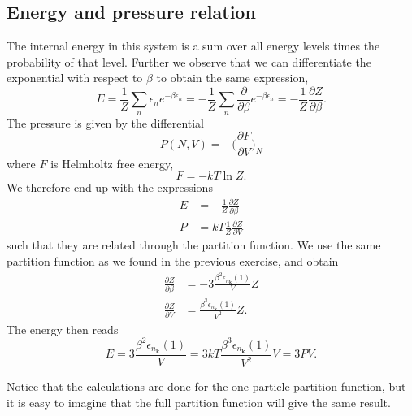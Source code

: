 \documentclass[norsk,a4paper,12pt]{article}
\begin{document}
\subsection{Energy and pressure relation}
The internal energy in this system is a sum over all energy levels times the probability of that level. Further we observe that we can differentiate the exponential with respect to $\beta$ to obtain the same expression,
\begin{equation}
E=\frac{1}{Z}\sum_n\epsilon_ne^{-\beta\epsilon_n}=-\frac{1}{Z}\sum_n\frac{\partial}{\partial\beta}e^{-\beta\epsilon_n}=-\frac{1}{Z}\frac{\partial Z}{\partial\beta}.
\end{equation}
The pressure is given by the differential
\begin{equation}
P(N,V)=-\Big(\frac{\partial F}{\partial V}\Big)_N
\end{equation}
where $F$ is Helmholtz free energy,
\begin{equation}
F=-kT\ln Z.
\end{equation}
We therefore end up with the expressions 
\begin{align}
E&=-\frac{1}{Z}\frac{\partial Z}{\partial\beta}\\
P&=kT\frac{1}{Z}\frac{\partial Z}{\partial V}
\end{align}
such that they are related through the partition function. We use the same partition function as we found in the previous exercise, and obtain
\begin{align}
\frac{\partial Z}{\partial \beta}&=-3\frac{\beta^2\epsilon_{n_{\boldsymbol{k}}}(1)}{V}Z\\
\frac{\partial Z}{\partial V}&=\frac{\beta^3\epsilon_{n_{\boldsymbol{k}}}(1)}{V^2}Z.
\end{align}
The energy then reads
\begin{equation}
E=3\frac{\beta^2\epsilon_{n_{\boldsymbol{k}}}(1)}{V}=3kT\frac{\beta^3\epsilon_{n_{\boldsymbol{k}}}(1)}{V^2}V=3PV.
\end{equation}

Notice that the calculations are done for the one particle partition function, but it is easy to imagine that the full partition function will give the same result. 
\end{document}
